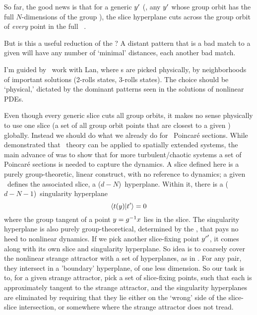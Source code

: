 


So far, the good news is that for a generic {\template}
${y'}$ (\ie, any ${y'}$ whose group orbit has the full $N$-dimensions
of the group \Group), the
slice hyperplane  cuts across the group orbit of {\em
every} point in the full \statesp\ \pS.

But is this a useful reduction of the \statesp? A distant pattern
that is a bad match to a given {\template} will have any number of
`minimal' distances, each another bad match.

I'm guided by \KS\ work with Lan, where {\PoincSec}s
are picked physically,
by neighborhoods of important solutions (2-rolls states, 3-rolls
states). The choice should be `physical,'
dictated by the dominant patterns seen in the solutions of
nonlinear PDEs.

Even though every generic
slice cuts all group orbits, it makes no sense physically to
use one slice
(a set of all group orbit points that are closest to a given {\template})
globally. Instead we should do what we
already do for \KS\ Poincar\'e sections. While  demonstrated
that \po\ theory can be applied to spatially extended systems, the
main advance of
 was to show that for more turbulent/chaotic systems a set
of Poincar\'e sections is needed to capture the dynamics.
A slice defined here is a purely group-theoretic, linear construct, with no reference
to dynamics; a given {\template} \slicep\ defines
the associated slice, a ($d\!-\!N$)\dmn\ hyperplane.
Within it, there is a ($d\!-\!N\!-1$)\dmn\
singularity hyperplane
\[
\braket{\groupTan(\sspRed)}{\sliceTan{}}=0
\]
where the group tangent of a point
$y=g^{-1} x$ lies in the slice. The singularity hyperplane
is also purely group-theoretical,
determined by the {\template} \slicep,
that pays no heed to nonlinear dynamics. If we pick another
slice-fixing point ${y'}'$, it comes along with its own slice
and singularity hyperplane. So idea is to coarsely cover the nonlinear
strange attractor with a set of hyperplanes, as in .
For any pair, they intersect in a 'boundary' hyperplane, of one less dimension.
So our task is to, for a given strange attractor, pick a set of slice-fixing
points, such that each is approximately tangent to the strange attractor,
and the singularity hyperplanes are eliminated by requiring that they
lie either on the `wrong' side of the slice-slice intersection, or somewhere where
the strange attractor does not tread.

